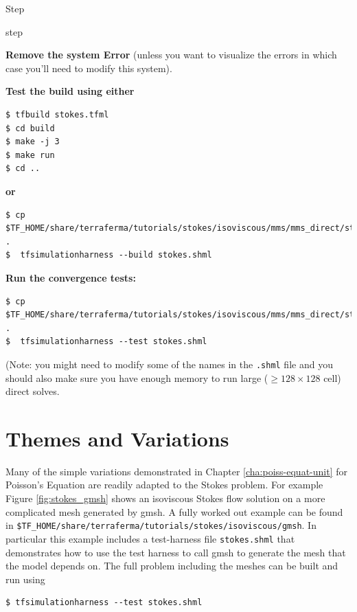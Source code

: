 \begin{steps}{Step}
\begin{steps}{step}
   \end{steps}
 \item \textbf{Remove the system Error} (unless you want to visualize
   the errors in which case you'll need to modify this system).
 \item \textbf{Test the build using either}
   \begin{lstlisting}[style=Bash]
$ tfbuild stokes.tfml
$ cd build
$ make -j 3
$ make run
$ cd ..
   \end{lstlisting}
   \textbf{or}
   \begin{lstlisting}[style=Bash]
$ cp $TF_HOME/share/terraferma/tutorials/stokes/isoviscous/mms/mms_direct/stokes.shml .
$  tfsimulationharness --build stokes.shml
\end{lstlisting} %
 \item \textbf{Run the convergence tests:}
   \begin{lstlisting}[style=Bash]
$ cp $TF_HOME/share/terraferma/tutorials/stokes/isoviscous/mms/mms_direct/stokes.shml .
$  tfsimulationharness --test stokes.shml
\end{lstlisting} %
(Note: you might need to modify some of the names in the
\texttt{.shml} file and you should also make sure you have enough
memory to run large ($\geq 128\times128$ cell) direct solves. 
\end{steps}


\section{Themes and Variations}
\label{sec:themes-variations}

Many of the simple variations demonstrated in Chapter
\ref{cha:poiss-equat-unit} for Poisson's Equation are readily adapted
to the Stokes problem.  For example Figure \ref{fig:stokes_gmsh} shows
an isoviscous Stokes flow solution on a more complicated mesh
generated by gmsh.  A fully worked out example 
can be found in
\texttt{\$TF\_HOME/share/terraferma/tutorials/stokes/isoviscous/gmsh}.
In particular this example includes  a test-harness file
\texttt{stokes.shml} that demonstrates how to use the test harness to
call gmsh to generate the mesh that the model depends on.  The full
problem including the meshes can be built and run using
\begin{lstlisting}[style=Bash]
$ tfsimulationharness --test stokes.shml
\end{lstlisting} %




